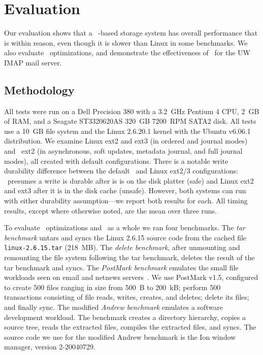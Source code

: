 \section {Evaluation}
\label{sec:evaluation}

Our evaluation shows that a \Kudos\ \patch-based storage system has
overall performance that is within reason, even though it is slower
than Linux in some benchmarks. We also evaluate \patch\ optimizations,
and demonstrate the effectiveness of \patchgroups\ for the UW IMAP
mail server.
%

\subsection{Methodology}

All tests were run on a Dell Precision 380 with a 3.2~GHz Pentium 4
CPU, 2~GB of RAM, and a Seagate ST3320620AS 320~GB 7200~RPM SATA2 disk.
%
All tests use a 10~GB file system and the Linux 2.6.20.1 kernel
with the Ubuntu v6.06.1 distribution.
%
We examine Linux ext2 and ext3 (in ordered and journal modes) and
\Kudos\ ext2 (in asynchronous, soft updates, metadata journal, and
full journal modes), all created with default configurations.
%
There is a notable write durability difference between the default
\Kudos\ and Linux ext2/3 configurations: \Kudos\ presumes a write is
durable after is is on the disk platter (safe) and Linux ext2 and ext3
after it is in the disk cache (unsafe). However, both systems can run
with either durability assumption---we report both results for each.
%
All timing results, except where otherwise noted, are the mean over three runs.

To evaluate \patch\ optimizations and \Kudos\ as a whole we ran four
benchmarks.
%
The \emph{tar benchmark} untars and syncs the Linux 2.6.15 source code
from the cached file \texttt{linux-2.6.15.tar} (218~MB).
%
The \emph{delete benchmark}, after unmounting and remounting the file
system following the tar benchmark, deletes the result of the tar
benchmark and syncs.
%
The \emph{PostMark benchmark} emulates the small file workloads seen
on email and netnews servers~\cite{postmark}. We use PostMark v1.5,
configured to create 500 files ranging in size from 500~B to 200~kB;
perform 500 transactions consisting of file reads, writes, creates,
and deletes; delete its files; and finally sync.
%
The modified \emph{Andrew benchmark} emulates a software development
workload.  The benchmark creates a directory hierarchy, copies a
source tree, reads the extracted files, compiles the extracted files,
and syncs. The source code we use for the modified Andrew benchmark is
the Ion window manager, version 2-20040729.

